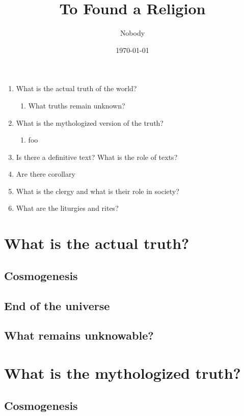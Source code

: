 \documentclass[12pt, letterpaper]{article}
\begin{document}
 
\title{To Found a Religion}
 \date{\today}
\author{Nobody}  
\maketitle


\begin{enumerate}
  \item What is the actual truth of the world?
    \begin{enumerate}
      \item What truths remain unknown?
     \end{enumerate}
  \item What is the mythologized version of the truth?
    \begin{enumerate}
      \item foo
     \end{enumerate}
  \item Is there a definitive text? What is the role of texts?
  \item Are there corollary 
  \item What is the clergy and what is their role in society?
  \item What are the liturgies and rites?	
\end{enumerate}


\section{What is the actual truth?}

\subsection{Cosmogenesis}

\subsection{End of the universe}

\subsection{What remains unknowable?}

\section{What is the mythologized truth?}

\subsection{Cosmogenesis}
\end{document}
